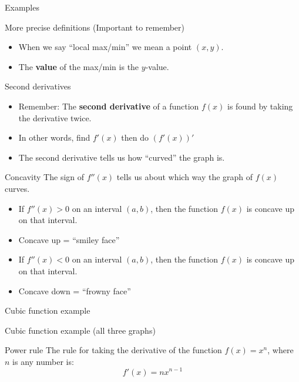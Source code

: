 \documentclass[t]{beamer}
\begin{document}
\begin{frame}{Examples}
\end{frame}

\begin{frame}{More precise definitions (Important to remember)}
\begin{itemize} 
\item When we say ``local max/min'' we mean a point $(x,y)$.
\item The \textbf{value} of the max/min is the $y$-value.
\end{itemize}
\end{frame}

\begin{frame}{Second derivatives}
\begin{itemize}
\item Remember: The \textbf{second derivative} of a function $f(x)$ is found by taking the derivative twice.
\item In other words, find $f'(x)$ then do $(f'(x))'$
\item The second derivative tells us how ``curved'' the graph is.
\end{itemize}
\end{frame}

\begin{frame}{Concavity}
The sign of $f''(x)$ tells us about which way the graph of $f(x)$ curves.
\begin{itemize}
\item If $f''(x) > 0$ on an interval $(a,b)$, then the function $f(x)$ is concave up on that interval.
\item Concave up = ``smiley face''
\item If $f''(x) < 0$ on an interval $(a,b)$, then the function $f(x)$ is concave up on that interval.
\item Concave down = ``frowny face''
\end{itemize}
\end{frame}

\begin{frame}{Cubic function example}
\end{frame}

\begin{frame}{Cubic function example (all three graphs)}
\end{frame}

\begin{frame}{Power rule}
The rule for taking the derivative of the function $f(x) = x^n$,
where $n$ is any number is:
$$ f'(x) = n x^{n-1}$$
\end{frame}
\end{document}
